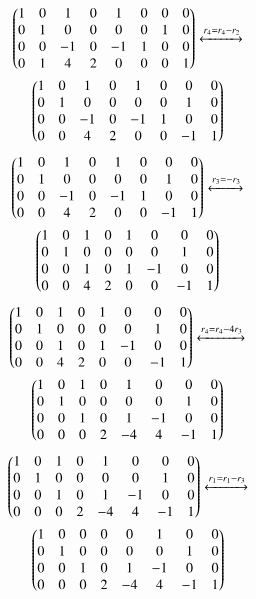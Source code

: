 \documentclass[journal,12pt,twocolumn]{IEEEtran}
\begin{document}
\begin{multline}
\begin{pmatrix}1 & 0 & 1 & 0& 1 &0 &0 & 0 \\0 & 1 & 0 & 0& 0 &0 &1 &0 \\ 0 & 0 & -1 & 0& -1&1 &0&0  \\ 0 & 1 & 4 & 2& 0 & 0& 0 &1\end{pmatrix} \xleftrightarrow[]{r_4 = r_4-r_2} \\	\begin{pmatrix}1 & 0 & 1 & 0& 1 &0 &0 & 0 \\0 & 1 & 0 & 0& 0 &0 &1 &0 \\ 0 & 0 & -1 & 0& -1&1 &0&0  \\ 0 & 0 & 4 & 2& 0 & 0& -1 &1\end{pmatrix}
\end{multline}
\begin{multline}
\begin{pmatrix}1 & 0 & 1 & 0& 1 &0 &0 & 0 \\0 & 1 & 0 & 0& 0 &0 &1 &0 \\ 0 & 0 & -1 & 0& -1&1 &0&0  \\ 0 & 0 & 4 & 2& 0 & 0& -1 &1\end{pmatrix} \xleftrightarrow[]{r_3=-r_3} \\ \begin{pmatrix}1 & 0 & 1 & 0& 1 &0 &0 & 0 \\0 & 1 & 0 & 0& 0 &0 &1 &0 \\ 0 & 0 & 1 & 0& 1&-1 &0&0  \\ 0 & 0 & 4 & 2& 0 & 0& -1 &1\end{pmatrix}
\end{multline}
\begin{multline}
\begin{pmatrix}1 & 0 & 1 & 0& 1 &0 &0 & 0 \\0 & 1 & 0 & 0& 0 &0 &1 &0 \\ 0 & 0 & 1 & 0& 1&-1 &0&0  \\ 0 & 0 & 4 & 2& 0 & 0& -1 &1\end{pmatrix} \xleftrightarrow[]{r_4=r_4-4r_3} \\ \begin{pmatrix}1 & 0 & 1 & 0& 1 &0 &0 & 0 \\0 & 1 & 0 & 0& 0 &0 &1 &0 \\ 0 & 0 & 1 & 0& 1&-1 &0&0  \\ 0 & 0 & 0 & 2& -4 & 4& -1 &1\end{pmatrix}
\end{multline}
\begin{multline}
\begin{pmatrix}1 & 0 & 1 & 0& 1 &0 &0 & 0 \\0 & 1 & 0 & 0& 0 &0 &1 &0 \\ 0 & 0 & 1 & 0& 1&-1 &0&0  \\ 0 & 0 & 0 & 2& -4 & 4& -1 &1\end{pmatrix} \xleftrightarrow[]{r_1 = r_1-r_3} \\ \begin{pmatrix}1 & 0 & 0 & 0& 0 &1 &0 & 0 \\0 & 1 & 0 & 0& 0 &0 &1 &0 \\ 0 & 0 & 1 & 0& 1&-1 &0&0  \\ 0 & 0 & 0 & 2& -4 & 4& -1 &1\end{pmatrix}
\end{multline}
\end{document}
